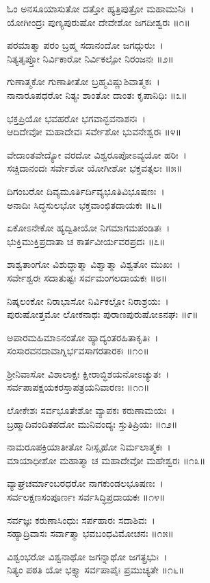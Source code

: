 ಓಂ ಅನಸೂಯಾಸುತೋ ದತ್ತೋ ಹ್ಯತ್ರಿಪುತ್ರೋ ಮಹಾಮುನಿಃ~।\\
ಯೋಗೀಂದ್ರಃ ಪುಣ್ಯಪುರುಷೋ ದೇವೇಶೋ ಜಗದೀಶ್ವರಃ ॥೧॥

ಪರಮಾತ್ಮಾ ಪರಂ ಬ್ರಹ್ಮ ಸದಾನಂದೋ ಜಗದ್ಗುರುಃ~।\\
ನಿತ್ಯತೃಪ್ತೋ ನಿರ್ವಿಕಾರೋ ನಿರ್ವಿಕಲ್ಪೋ ನಿರಂಜನಃ ॥೨॥

ಗುಣಾತ್ಮಕೋ ಗುಣಾತೀತೋ ಬ್ರಹ್ಮವಿಷ್ಣುಶಿವಾತ್ಮಕಃ~।\\
ನಾನಾರೂಪಧರೋ ನಿತ್ಯಃ ಶಾಂತೋ ದಾಂತಃ ಕೃಪಾನಿಧಿಃ ॥೩॥

ಭಕ್ತಪ್ರಿಯೋ ಭವಹರೋ ಭಗವಾನ್ಭವನಾಶನಃ~।\\
ಆದಿದೇವೋ ಮಹಾದೇವಃ ಸರ್ವೇಶೋ ಭುವನೇಶ್ವರಃ ॥೪॥

ವೇದಾಂತವೇದ್ಯೋ ವರದೋ ವಿಶ್ವರೂಪೋಽವ್ಯಯೋ ಹರಿಃ~।\\
ಸಚ್ಚಿದಾನಂದಃ ಸರ್ವೇಶೋ ಯೋಗೀಶೋ ಭಕ್ತವತ್ಸಲಃ ॥೫॥

ದಿಗಂಬರೋ ದಿವ್ಯಮೂರ್ತಿರ್ದಿವ್ಯಭೂತಿವಿಭೂಷಣಃ~।\\
ಅನಾದಿಃ ಸಿದ್ಧಸುಲಭೋ ಭಕ್ತವಾಂಛಿತದಾಯಕಃ ॥೬॥

ಏಕೋಽನೇಕೋ ಹ್ಯದ್ವಿತೀಯೋ ನಿಗಮಾಗಮಪಂಡಿತಃ~।\\
ಭುಕ್ತಿಮುಕ್ತಿಪ್ರದಾತಾ ಚ ಕಾರ್ತವೀರ್ಯವರಪ್ರದಃ ॥೭॥

ಶಾಶ್ವತಾಂಗೋ ವಿಶುದ್ಧಾತ್ಮಾ ವಿಶ್ವಾತ್ಮಾ ವಿಶ್ವತೋ ಮುಖಃ~।\\
ಸರ್ವೇಶ್ವರಃ ಸದಾತುಷ್ಟಃ ಸರ್ವಮಂಗಲದಾಯಕಃ ॥೮॥

ನಿಷ್ಕಲಂಕೋ ನಿರಾಭಾಸೋ ನಿರ್ವಿಕಲ್ಪೋ ನಿರಾಶ್ರಯಃ~।\\
ಪುರುಷೋತ್ತಮೋ ಲೋಕನಾಥಃ ಪುರಾಣಪುರುಷೋಽನಘಃ ॥೯॥

ಅಪಾರಮಹಿಮಾಽನಂತೋ ಹ್ಯಾದ್ಯಂತರಹಿತಾಕೃತಿಃ~।\\
ಸಂಸಾರವನದಾವಾಗ್ನಿರ್ಭವಸಾಗರತಾರಕಃ ॥೧೦॥

ಶ್ರೀನಿವಾಸೋ ವಿಶಾಲಾಕ್ಷಃ ಕ್ಷೀರಾಬ್ಧಿಶಯನೋಽಚ್ಯುತಃ~।\\
ಸರ್ವಪಾಪಕ್ಷಯಕರಸ್ತಾಪತ್ರಯನಿವಾರಣಃ ॥೧೧॥

ಲೋಕೇಶಃ ಸರ್ವಭೂತೇಶೋ ವ್ಯಾಪಕಃ ಕರುಣಾಮಯಃ~।\\
ಬ್ರಹ್ಮಾದಿವಂದಿತಪದೋ ಮುನಿವಂದ್ಯಃ ಸ್ತುತಿಪ್ರಿಯಃ ॥೧೨॥

ನಾಮರೂಪಕ್ರಿಯಾತೀತೋ ನಿಃಸ್ಪೃಹೋ ನಿರ್ಮಲಾತ್ಮಕಃ~।\\
ಮಾಯಾಧೀಶೋ ಮಹಾತ್ಮಾ ಚ ಮಹಾದೇವೋ ಮಹೇಶ್ವರಃ ॥೧೩॥

ವ್ಯಾಘ್ರಚರ್ಮಾಂಬರಧರೋ ನಾಗಕುಂಡಲಭೂಷಣಃ~।\\
ಸರ್ವಲಕ್ಷಣಸಂಪೂರ್ಣಃ ಸರ್ವಸಿದ್ಧಿಪ್ರದಾಯಕಃ ॥೧೪॥

ಸರ್ವಜ್ಞಃ ಕರುಣಾಸಿಂಧುಃ ಸರ್ಪಹಾರಃ ಸದಾಶಿವಃ~।\\
ಸಹ್ಯಾದ್ರಿವಾಸಃ ಸರ್ವಾತ್ಮಾ ಭವಬಂಧವಿಮೋಚನಃ ॥೧೫॥

ವಿಶ್ವಂಭರೋ ವಿಶ್ವನಾಥೋ ಜಗನ್ನಾಥೋ ಜಗತ್ಪ್ರಭುಃ~।\\
ನಿತ್ಯಂ ಪಠತಿ ಯೋ ಭಕ್ತ್ಯಾ ಸರ್ವಪಾಪೈಃ ಪ್ರಮುಚ್ಯತೇ ॥೧೬॥

